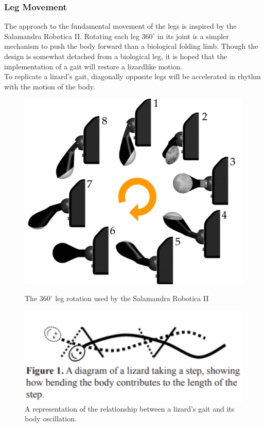\documentclass{article}
\begin{document}
\subsubsection{Leg Movement}
\label{sec:Leg Movement}
The approach to the fundamental movement of the legs is inspired by the Salamandra Robotica II.  Rotating each leg $360^\circ$ in its joint is a simpler mechanism to push the body forward than a biological folding limb. Though the design is somewhat detached from a biological leg, it is hoped that the implementation of a gait will restore a lizardlike motion.\\
To replicate a lizard's gait, diagonally opposite legs will be accelerated in rhythm with the motion of the body. 
\begin{figure}[H]
\begin{minipage}[t]{.4\textwidth}
\centering
\includegraphics[width=1\textwidth]{salamandraLegSpin}
\caption{The $360^\circ$ leg rotation used by the Salamandra Robotica II \citep{salamandra}}
\end{minipage}
\hfill
\begin{minipage}[t]{.55\textwidth}
\centering
\includegraphics[width=1\textwidth]{lizardGait}
\caption{A representation of the relationship between a lizard's gait and its body oscillation. \citep{reptileLocomotion}}
\end{minipage}
\end{figure}
\end{document}
